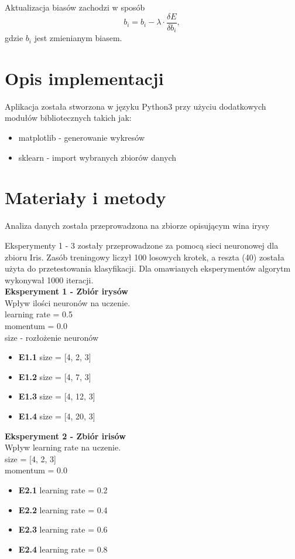 \documentclass{classrep}
\begin{document}
Aktualizacja biasów zachodzi w sposób
\begin{equation} \label{eq:generalBackPropagationBias}
	b_i = b_i - \lambda \cdot \frac{\delta E}{\delta b_i},
\end{equation}
gdzie $b_i$ jest zmienianym biasem.

\section{Opis implementacji}
Aplikacja została stworzona w języku Python3 przy użyciu dodatkowych modułów bibliotecznych takich jak:
		\begin{itemize}
			\item matplotlib - generowanie wykresów
			\item sklearn - import wybranych zbiorów danych
		\end{itemize}

\section{Materiały i metody}
Analiza danych została przeprowadzona na zbiorze opisującym wina irysy \cite{irisdataset}


Eksperymenty 1 - 3 zostały przeprowadzone za pomocą sieci neuronowej dla zbioru Iris. Zasób treningowy liczył 100 losowych krotek, a reszta (40) została użyta do przetestowania klasyfikacji. Dla omawianych eksperymentów algorytm wykonywał 1000 iteracji.\\


\textbf{Eksperyment 1 - Zbiór irysów}\\
		Wpływ ilości neuronów na uczenie.\\
		learning rate = 0.5\\
		momentum = 0.0\\
		size - rozłożenie neuronów
		\begin{itemize}
			\item \textbf{E1.1}
			 size = [4, 2, 3]
			\item \textbf{E1.2} 
			size = [4, 7, 3]
			\item \textbf{E1.3}
			size = [4, 12, 3]
			\item \textbf{E1.4}
			size = [4, 20, 3]\\
		\end{itemize}
	
	\textbf{Eksperyment 2 - Zbiór irisów}\\
		Wpływ learning rate na uczenie.\\
		size = [4, 2, 3]\\
		momentum =  0.0
		\begin{itemize}
			\item \textbf{E2.1}
			 learning rate = 0.2
			\item \textbf{E2.2} 
			learning rate = 0.4
			\item \textbf{E2.3}
			learning rate = 0.6
			\item \textbf{E2.4}
			learning rate = 0.8\\
		\end{itemize}
	
\end{document}
